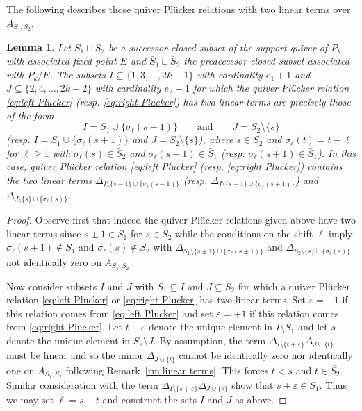\documentclass{amsart}
\newtheorem{lemma}[theorem]{Lemma}
\numberwithin{equation}{section}
\begin{document}
  The following describes those quiver Pl\"ucker relations with two linear terms over $A_{S_1,S_2}$.
  \begin{lemma}
    Let $S_1\sqcup S_2$ be a successor-closed subset of the support quiver of $\tilde P_k$ with associated fixed point $E$ and $\bar{S}_1\sqcup\bar{S}_2$ the predecessor-closed subset associated with $P_k/E$.
    The subsets $I\subseteq\{1,3,\ldots,2k-1\}$ with cardinality $e_1+1$ and $J\subseteq\{2,4,\ldots, 2k-2\}$ with cardinality $e_2-1$ for which the quiver Pl\"ucker relation \eqref{eq:left Plucker} (resp. \eqref{eq:right Plucker}) has two linear terms are precisely those of the form
    \[I=S_1\cup\{\sigma_\ell(s-1)\} \qquad \text{and} \qquad J=S_2\setminus\{s\}\]
    (resp. $I=S_1\cup\{\sigma_\ell(s+1)\}$ and $J=S_2\setminus\{s\}$), where $s\in S_2$ and $\sigma_\ell(t)=t-\ell$ for $\ell\ge1$ with $\sigma_\ell(s)\in\bar{S}_2$ and $\sigma_\ell(s-1)\in\bar{S}_1$ (resp. $\sigma_\ell(s+1)\in\bar{S}_1$).
    In this case, quiver Pl\"ucker relation \eqref{eq:left Plucker} (resp. \eqref{eq:right Plucker}) contains the two linear terms $\Delta_{I\setminus\{s-1\}\cup\{\sigma_\ell(s-1)\}}$ (resp. $\Delta_{I\setminus\{s+1\}\cup\{\sigma_\ell(s+1)\}}$) and $\Delta_{J\setminus\{s\}\cup\{\sigma_\ell(s)\}}$.
  \end{lemma}
  \begin{proof}
    Observe first that indeed the quiver Pl\"ucker relations given above have two linear terms since $s\pm1\in S_1$ for $s\in S_2$ while the conditions on the shift $\ell$ imply $\sigma_\ell(s\pm1)\notin S_1$ and $\sigma_\ell(s)\notin S_2$ with $\Delta_{S_1\setminus\{s\pm1\}\cup\{\sigma_\ell(s\pm1)\}}$ and $\Delta_{S_2\setminus\{s\}\cup\{\sigma_\ell(s)\}}$ not identically zero on $A_{S_1,S_2}$.

    Now consider subsets $I$ and $J$ with $S_1\subseteq I$ and $J\subseteq S_2$ for which a quiver Pl\"ucker relation \eqref{eq:left Plucker} or \eqref{eq:right Plucker} has two linear terms.
    Set $\varepsilon=-1$ if this relation comes from \eqref{eq:left Plucker} and set $\varepsilon=+1$ if this relation comes from \eqref{eq:right Plucker}.
    Let $t+\varepsilon$ denote the unique element in $I\setminus S_1$ and let $s$ denote the unique element in $S_2\setminus J$.
    By assumption, the term $\Delta_{I\setminus\{t+\varepsilon\}} \Delta_{J\cup\{t\}}$ must be linear and so the minor $\Delta_{J\cup\{t\}}$ cannot be identically zero nor identically one on $A_{S_1,S_2}$ following Remark~\ref{rm:linear terms}.
    This forces $t<s$ and $t\in\bar{S_2}$.
    Similar consideration with the term $\Delta_{I\setminus\{s+\varepsilon\}} \Delta_{J\cup\{s\}}$ show that $s+\varepsilon\in\bar{S}_1$.
    Thus we may set $\ell=s-t$ and construct the sets $I$ and $J$ as above.
  \end{proof}
\end{document}
